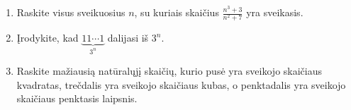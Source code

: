 \begin{enumerate}
  \item {} Raskite visus sveikuosius $n$, su kuriais
    skaičius $\frac{n^3+3}{n^2+7}$ yra sveikasis.
  \item Įrodykite, kad $\underbrace{11\cdots1}_{3^n}$ dalijasi iš $3^n$.  
  \item \text{[LitKo 2002]} Raskite mažiausią natūralųjį skaičių, kurio
    pusė yra sveikojo skaičiaus kvadratas, trečdalis yra sveikojo skaičiaus
    kubas, o penktadalis yra sveikojo skaičiaus penktasis laipsnis.

\end{enumerate}

